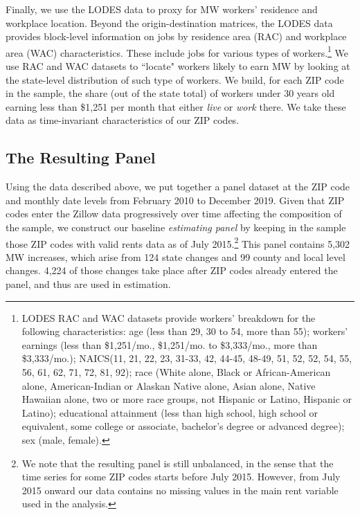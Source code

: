 Finally, we use the LODES data to proxy for MW workers' residence and workplace location. 
Beyond the origin-destination matrices, the LODES data provides block-level information on 
jobs by residence area (RAC) and workplace area (WAC) characteristics. These include jobs 
for various types of workers.\footnote{LODES RAC and WAC datasets provide workers' breakdown 
	for the following characteristics: age (less than 29, 30 to 54, more than 55); workers' 
	earnings (less than \$1,251/mo., \$1,251/mo. to \$3,333/mo., more than \$3,333/mo.); 
	NAICS(11, 21, 22, 23, 31-33, 42, 44-45, 48-49, 51, 52, 52, 54, 55, 56, 61, 62, 71, 72, 
	81, 92); race (White alone, Black or African-American alone, American-Indian or Alaskan 	
	Native alone, Asian alone, Native Hawaiian alone, two or more race groups, not Hispanic 
	or Latino, Hispanic or Latino); educational attainment (less than high school, high 
	school or equivalent, some college or associate, bachelor's degree or advanced degree); 
	sex (male, female).} 
We use RAC and WAC datasets to ``locate" workers likely to earn MW by looking at the 
state-level distribution of such type of workers. We build, for each ZIP code in the sample, 
the share (out of the state total) of workers under 30 years old earning less than \$1,251 
per month that either \textit{live} or \textit{work} there. We take these data as 
time-invariant characteristics of our ZIP codes.


\subsection{The Resulting Panel}\label{sec:data_final_panel}

Using the data described above, we put together a panel dataset at the ZIP code and monthly 
date levels from February 2010 to December 2019. Given that ZIP codes enter the Zillow data 
progressively over time affecting the composition of the sample, we construct our baseline 
\textit{estimating panel} by keeping in the sample those ZIP codes with valid rents data as 
of July 2015.\footnote{We note that the resulting panel is still unbalanced, in the sense 
	that the time series for some ZIP codes starts before July 2015. However, from July
	2015 onward our data contains no missing values in the main rent variable used in the 
	analysis.} 
This panel contains 5,302 MW increases, which arise from 124 state changes and 99 county 
and local level changes. 4,224 of those changes take place after ZIP codes already entered
the panel, and thus are used in estimation.

